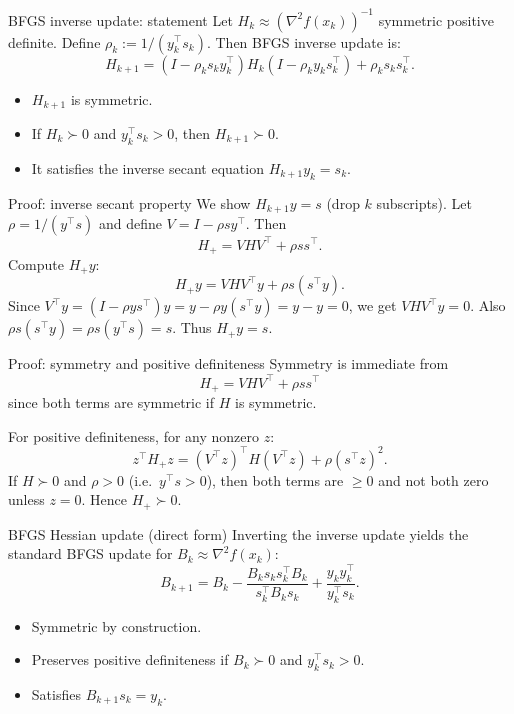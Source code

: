 \documentclass[aspectratio=169]{beamer}
\begin{document}
\begin{frame}{BFGS inverse update: statement}
Let $H_k\approx (\nabla^2 f(x_k))^{-1}$ symmetric positive definite.
Define $\rho_k := 1/(y_k^\top s_k)$.
Then BFGS inverse update is:
\[
\boxed{
H_{k+1} =
\left(I-\rho_k s_k y_k^\top\right)H_k\left(I-\rho_k y_k s_k^\top\right)
+\rho_k s_k s_k^\top.
}
\]
\begin{itemize}
\item $H_{k+1}$ is symmetric.
\item If $H_k\succ 0$ and $y_k^\top s_k>0$, then $H_{k+1}\succ 0$.
\item It satisfies the inverse secant equation $H_{k+1}y_k=s_k$.
\end{itemize}
\end{frame}

\begin{frame}{Proof: inverse secant property}
We show $H_{k+1}y=s$ (drop $k$ subscripts).
Let $\rho=1/(y^\top s)$ and define $V=I-\rho s y^\top$.
Then
\[
H_{+} = V H V^\top + \rho s s^\top.
\]
Compute $H_{+}y$:
\[
H_{+}y = V H V^\top y + \rho s(s^\top y).
\]
Since $V^\top y = (I-\rho y s^\top)y = y-\rho y(s^\top y)=y-y=0$,
we get $VHV^\top y=0$. Also $\rho s(s^\top y)=\rho s(y^\top s)=s$.
Thus $H_{+}y=s$.
\end{frame}

\begin{frame}{Proof: symmetry and positive definiteness}
Symmetry is immediate from
\[
H_{+}=VHV^\top+\rho ss^\top
\]
since both terms are symmetric if $H$ is symmetric.

For positive definiteness, for any nonzero $z$:
\[
z^\top H_{+} z = (V^\top z)^\top H (V^\top z) + \rho (s^\top z)^2.
\]
If $H\succ 0$ and $\rho>0$ (i.e.\ $y^\top s>0$), then both terms are $\ge 0$ and not both zero
unless $z=0$. Hence $H_{+}\succ 0$.
\end{frame}

\begin{frame}{BFGS Hessian update (direct form)}
Inverting the inverse update yields the standard BFGS update for $B_k\approx \nabla^2 f(x_k)$:
\[
\boxed{
B_{k+1} = B_k
-\frac{B_k s_k s_k^\top B_k}{s_k^\top B_k s_k}
+\frac{y_k y_k^\top}{y_k^\top s_k}.
}
\]
\begin{itemize}
\item Symmetric by construction.
\item Preserves positive definiteness if $B_k\succ 0$ and $y_k^\top s_k>0$.
\item Satisfies $B_{k+1}s_k=y_k$.
\end{itemize}
\end{frame}
\end{document}
